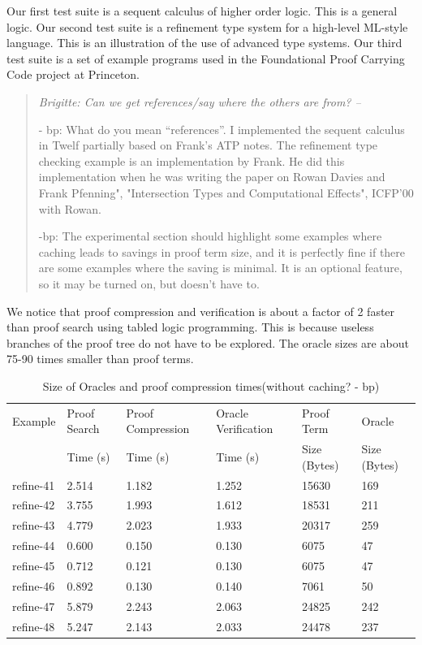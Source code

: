 \documentclass{acmconf}
\newenvironment{note}{\begin{quote}\message{note!}\it}{\end{quote}}
\begin{document}
Our first test suite is a sequent calculus of higher order logic. This 
is a general logic. Our second test suite is a refinement type system for 
a high-level ML-style language. This is an illustration of the use of 
advanced type systems. Our third test suite is a set of example programs
used in the Foundational Proof Carrying Code project at Princeton.
\begin{note}
  Brigitte: Can we get references/say where the others are from? --

  - bp:  What do you mean ``references''. 
  I implemented the sequent calculus in Twelf partially based on
  Frank's ATP notes. The refinement type checking example is an
  implementation by Frank. He did this implementation when he was
  writing the paper on Rowan Davies and Frank Pfenning", "Intersection
  Types and Computational Effects", ICFP'00  with Rowan.  

  -bp: The experimental section should highlight some examples where
  caching leads to savings in proof term size, and it is perfectly
  fine if there are some examples where the saving is minimal. It is
  an optional feature, so it may be turned on, but doesn't have to.
\end{note}

We notice that proof compression and verification is about a factor of 2
faster than proof search using tabled logic programming. This is because 
useless branches of the proof tree do not have to be explored. The oracle
sizes are about 75-90 times smaller than proof terms.

\begin{table}[tbp]
\begin{center}
\begin{small}
\begin{tabular}{|l|l|l|l|l|l|}
\hline
Example & Proof Search & Proof Compression 
& Oracle Verification & Proof Term & Oracle \\
& Time (s) & Time (s) & Time (s) & Size (Bytes) & Size (Bytes)\\
\hline
refine-41 & 2.514 & 1.182 & 1.252 & 15630 & 169\\
refine-42 & 3.755 & 1.993 & 1.612 & 18531 & 211\\
refine-43 & 4.779 & 2.023 & 1.933 & 20317 & 259\\
refine-44 & 0.600 & 0.150 & 0.130 & 6075 & 47\\
refine-45 & 0.712 & 0.121 & 0.130 & 6075 & 47\\
refine-46 & 0.892 & 0.130 & 0.140 & 7061 & 50\\
refine-47 & 5.879 & 2.243 & 2.063 & 24825 & 242\\
refine-48 & 5.247 & 2.143 & 2.033 & 24478 & 237\\
\hline
\end{tabular}
\end{small}
\end{center}
\caption{\label{tab:proofsize} Size of Oracles and proof compression
  times(without caching? - bp)}
\end{table}
\end{document}
